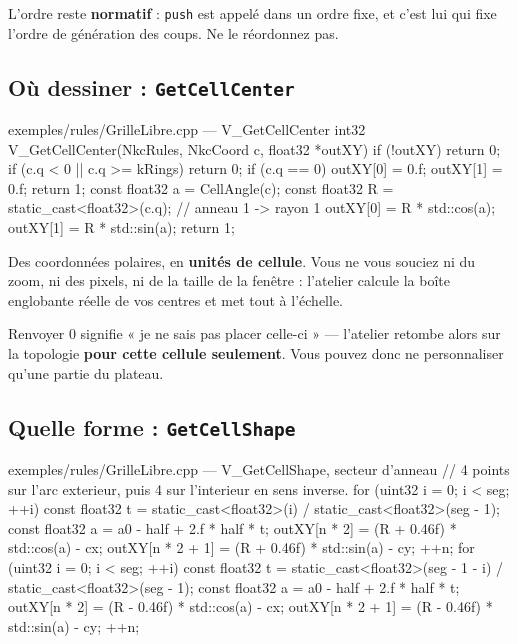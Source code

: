 \begin{nkretenir}
L'ordre reste \textbf{normatif} : \texttt{push} est appelé dans un ordre fixe, et
c'est lui qui fixe l'ordre de génération des coups. Ne le réordonnez pas.
\end{nkretenir}

\subsection{Où dessiner : \texttt{GetCellCenter}}

\begin{nkcode}{exemples/rules/GrilleLibre.cpp — V\_GetCellCenter}
int32 V_GetCellCenter(NkcRules, NkcCoord c, float32 *outXY) {
    if (!outXY) return 0;
    if (c.q < 0 || c.q >= kRings) return 0;
    if (c.q == 0) { outXY[0] = 0.f; outXY[1] = 0.f; return 1; }
    const float32 a = CellAngle(c);
    const float32 R = static_cast<float32>(c.q);   // anneau 1 -> rayon 1
    outXY[0] = R * std::cos(a);
    outXY[1] = R * std::sin(a);
    return 1;
}
\end{nkcode}

Des coordonnées polaires, en \textbf{unités de cellule}. Vous ne vous souciez ni
du zoom, ni des pixels, ni de la taille de la fenêtre : l'atelier calcule la boîte
englobante réelle de vos centres et met tout à l'échelle.

Renvoyer 0 signifie « je ne sais pas placer celle-ci » — l'atelier retombe alors
sur la topologie \textbf{pour cette cellule seulement}. Vous pouvez donc ne
personnaliser qu'une partie du plateau.

\subsection{Quelle forme : \texttt{GetCellShape}}

\begin{nkcode}{exemples/rules/GrilleLibre.cpp — V\_GetCellShape, secteur d'anneau}
// 4 points sur l'arc exterieur, puis 4 sur l'interieur en sens inverse.
for (uint32 i = 0; i < seg; ++i) {
    const float32 t = static_cast<float32>(i) / static_cast<float32>(seg - 1);
    const float32 a = a0 - half + 2.f * half * t;
    outXY[n * 2]     = (R + 0.46f) * std::cos(a) - cx;
    outXY[n * 2 + 1] = (R + 0.46f) * std::sin(a) - cy;
    ++n;
}
for (uint32 i = 0; i < seg; ++i) {
    const float32 t = static_cast<float32>(seg - 1 - i) / static_cast<float32>(seg - 1);
    const float32 a = a0 - half + 2.f * half * t;
    outXY[n * 2]     = (R - 0.46f) * std::cos(a) - cx;
    outXY[n * 2 + 1] = (R - 0.46f) * std::sin(a) - cy;
    ++n;
}
\end{nkcode}

